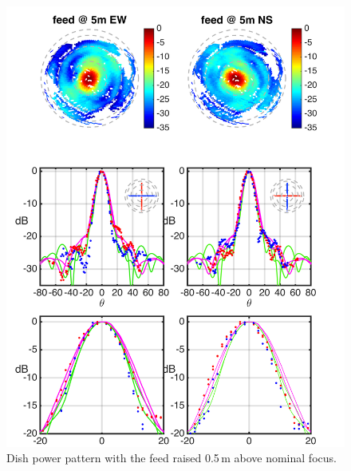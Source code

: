 \documentclass[preprint]{aastex}
\begin{document}
\begin{figure}[h]
\includegraphics[width=6.5in]{dish2_abs_old_ref_model.png}
\caption{Dish power pattern with the feed raised 0.5\,m above nominal focus.}
\label{fig:dish2}
\end{figure}
\end{document}
